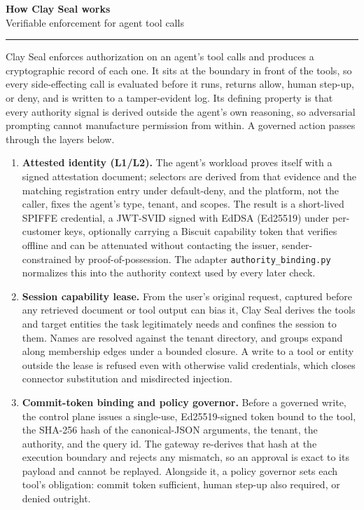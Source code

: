 \documentclass[10pt]{article}
\newcommand{\code}[1]{\texttt{\small #1}}
\begin{document}
{\LARGE\bfseries How Clay Seal works}\\[2pt]
{\color{gray}\small Verifiable enforcement for agent tool calls}
\rule{\linewidth}{0.4pt}

Clay Seal enforces authorization on an agent's tool calls and produces a cryptographic record of each one. It sits at the boundary in front of the tools, so every side-effecting call is evaluated before it runs, returns allow, human step-up, or deny, and is written to a tamper-evident log. Its defining property is that every authority signal is derived outside the agent's own reasoning, so adversarial prompting cannot manufacture permission from within. A governed action passes through the layers below.

\begin{enumerate}[leftmargin=1.4em, itemsep=3pt, topsep=3pt, parsep=0pt]

\item \textbf{Attested identity (L1/L2).} The agent's workload proves itself with a signed attestation document; selectors are derived from that evidence and the matching registration entry under default-deny, and the platform, not the caller, fixes the agent's type, tenant, and scopes. The result is a short-lived SPIFFE credential, a JWT-SVID signed with EdDSA (Ed25519) under per-customer keys, optionally carrying a Biscuit capability token that verifies offline and can be attenuated without contacting the issuer, sender-constrained by proof-of-possession. The adapter \code{authority\_binding.py} normalizes this into the authority context used by every later check.

\item \textbf{Session capability lease.} From the user's original request, captured before any retrieved document or tool output can bias it, Clay Seal derives the tools and target entities the task legitimately needs and confines the session to them. Names are resolved against the tenant directory, and groups expand along membership edges under a bounded closure. A write to a tool or entity outside the lease is refused even with otherwise valid credentials, which closes connector substitution and misdirected injection.

\item \textbf{Commit-token binding and policy governor.} Before a governed write, the control plane issues a single-use, Ed25519-signed token bound to the tool, the SHA-256 hash of the canonical-JSON arguments, the tenant, the authority, and the query id. The gateway re-derives that hash at the execution boundary and rejects any mismatch, so an approval is exact to its payload and cannot be replayed. Alongside it, a policy governor sets each tool's obligation: commit token sufficient, human step-up also required, or denied outright.


\end{enumerate}
\end{document}
